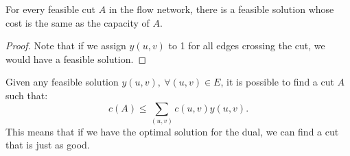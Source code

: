 \documentclass[../main/main.tex]{subfiles}
\begin{document}
\begin{lemma}
	For every feasible cut $A$ in the flow network, there is a feasible solution whose cost is the same as the capacity of $A$.
\end{lemma}
\begin{proof}
	Note that if we assign $y(u,v)$ to 1 for all edges crossing the cut, we would have a feasible solution.
\end{proof}
\begin{lemma}
	Given any feasible solution $y(u,v),\ \forall (u,v)\in E$, it  is possible to find a cut $A$ such that: \[
		c(A)\le \sum_{(u,v)}c(u,v)y(u,v)
	.\] This means that if we have the optimal solution for the dual, we can find a cut that is just as good.
\end{lemma}
\end{document}
